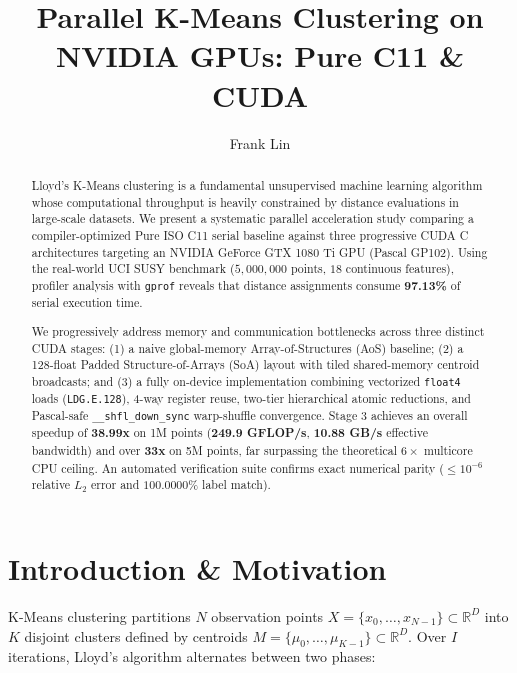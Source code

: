 \documentclass[sigconf,nonacm]{acmart}
\begin{document}
\title{Parallel K-Means Clustering on NVIDIA GPUs: Pure C11 \& CUDA}

\author{Frank Lin}

\begin{abstract}
Lloyd's K-Means clustering is a fundamental unsupervised machine learning algorithm whose computational throughput is heavily constrained by distance evaluations in large-scale datasets. We present a systematic parallel acceleration study comparing a compiler-optimized Pure ISO C11 serial baseline against three progressive CUDA C architectures targeting an NVIDIA GeForce GTX 1080 Ti GPU (Pascal GP102). Using the real-world UCI SUSY benchmark ($5{,}000{,}000$ points, $18$ continuous features), profiler analysis with \texttt{gprof} reveals that distance assignments consume \textbf{97.13\%} of serial execution time. 

We progressively address memory and communication bottlenecks across three distinct CUDA stages: (1) a naive global-memory Array-of-Structures (AoS) baseline; (2) a 128-float Padded Structure-of-Arrays (SoA) layout with tiled shared-memory centroid broadcasts; and (3) a fully on-device implementation combining vectorized \texttt{float4} loads (\texttt{LDG.E.128}), 4-way register reuse, two-tier hierarchical atomic reductions, and Pascal-safe \texttt{\_\_shfl\_down\_sync} warp-shuffle convergence. Stage 3 achieves an overall speedup of \textbf{38.99x} on 1M points (\textbf{249.9 GFLOP/s}, \textbf{10.88 GB/s} effective bandwidth) and over \textbf{33x} on 5M points, far surpassing the theoretical $6\times$ multicore CPU ceiling. An automated verification suite confirms exact numerical parity ($\le 10^{-6}$ relative $L_2$ error and $100.0000\%$ label match).
\end{abstract}


\maketitle

\section{Introduction \& Motivation}
K-Means clustering partitions $N$ observation points $X = \{x_0, \dots, x_{N-1}\} \subset \mathbb{R}^D$ into $K$ disjoint clusters defined by centroids $M = \{\mu_0, \dots, \mu_{K-1}\} \subset \mathbb{R}^D$. Over $I$ iterations, Lloyd's algorithm alternates between two phases:
\end{document}

